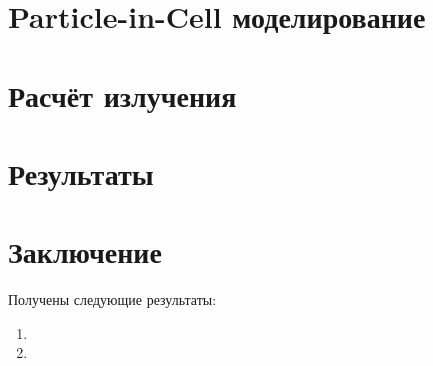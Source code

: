 \section{Particle-in-Cell моделирование }


\section{Расчёт излучения}




\section{Результаты}




\FloatBarrier
\section{Заключение}
 

Получены следующие результаты:
\begin{enumerate}
\item 
\item 
\end{enumerate}


\clearpage